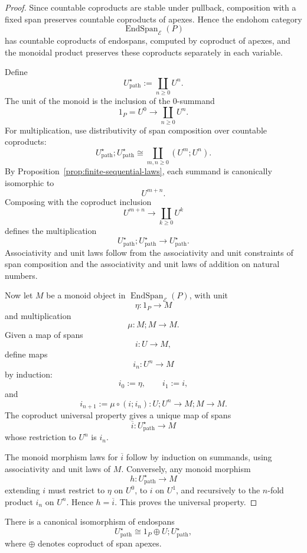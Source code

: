 \begin{proof}
Since countable coproducts are stable under pullback, composition with a fixed span preserves countable coproducts of apexes. Hence the endohom category
\[
\operatorname{EndSpan}_{\mathcal E}(P)
\]
has countable coproducts of endospans, computed by coproduct of apexes, and the monoidal product preserves these coproducts separately in each variable.

Define
\[
U^\star_{\mathrm{path}}:=\coprod_{n\ge0}U^n.
\]
The unit of the monoid is the inclusion of the \(0\)-summand
\[
1_P=U^0\to \coprod_{n\ge0}U^n.
\]
For multiplication, use distributivity of span composition over countable coproducts:
\[
U^\star_{\mathrm{path}};U^\star_{\mathrm{path}}
\cong
\coprod_{m,n\ge0}(U^m;U^n).
\]
By Proposition~\ref{prop:finite-sequential-laws}, each summand is canonically isomorphic to
\[
U^{m+n}.
\]
Composing with the coproduct inclusion
\[
U^{m+n}\to \coprod_{k\ge0}U^k
\]
defines the multiplication
\[
U^\star_{\mathrm{path}};U^\star_{\mathrm{path}}
\to
U^\star_{\mathrm{path}}.
\]
Associativity and unit laws follow from the associativity and unit constraints of span composition and the associativity and unit laws of addition on natural numbers.

Now let \(M\) be a monoid object in \(\operatorname{EndSpan}_{\mathcal E}(P)\), with unit
\[
\eta:1_P\to M
\]
and multiplication
\[
\mu:M;M\to M.
\]
Given a map of spans
\[
i:U\to M,
\]
define maps
\[
i_n:U^n\to M
\]
by induction:
\[
i_0:=\eta,
\qquad
i_1:=i,
\]
and
\[
i_{n+1}:=
\mu\circ(i;i_n):U;U^n\to M;M\to M.
\]
The coproduct universal property gives a unique map of spans
\[
\overline{i}:U^\star_{\mathrm{path}}\to M
\]
whose restriction to \(U^n\) is \(i_n\).

The monoid morphism laws for \(\overline{i}\) follow by induction on summands, using associativity and unit laws of \(M\). Conversely, any monoid morphism
\[
h:U^\star_{\mathrm{path}}\to M
\]
extending \(i\) must restrict to \(\eta\) on \(U^0\), to \(i\) on \(U^1\), and recursively to the \(n\)-fold product \(i_n\) on \(U^n\). Hence \(h=\overline{i}\). This proves the universal property.
\end{proof}

\begin{proposition}
\label{prop:path-star-equation}
There is a canonical isomorphism of endospans
\[
U^\star_{\mathrm{path}}
\cong
1_P\oplus U;U^\star_{\mathrm{path}},
\]
where \(\oplus\) denotes coproduct of span apexes.
\end{proposition}


